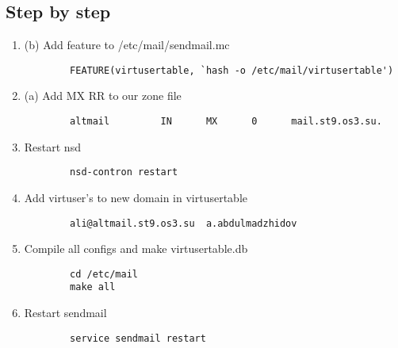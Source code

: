 \documentclass[10pt]{article}
\begin{document}
\subsection{Step by step \newline}
  \begin{enumerate}
    \item (b) Add feature to /etc/mail/sendmail.mc 
    \begin{verbatim}
        FEATURE(virtusertable, `hash -o /etc/mail/virtusertable')
    \end{verbatim}
    \item (a) Add MX RR to our zone file
    \begin{verbatim}
        altmail         IN      MX      0      mail.st9.os3.su.
    \end{verbatim}
    \item Restart nsd
    \begin{verbatim}
        nsd-contron restart
    \end{verbatim}
    \item Add virtuser's to new domain in virtusertable
    \begin{verbatim}
        ali@altmail.st9.os3.su  a.abdulmadzhidov
    \end{verbatim}
    \item Compile all configs and make virtusertable.db
    \begin{verbatim}
        cd /etc/mail
        make all
    \end{verbatim}
    \item Restart sendmail
    \begin{verbatim}
        service sendmail restart
    \end{verbatim}
  \end{enumerate}
\end{document}

